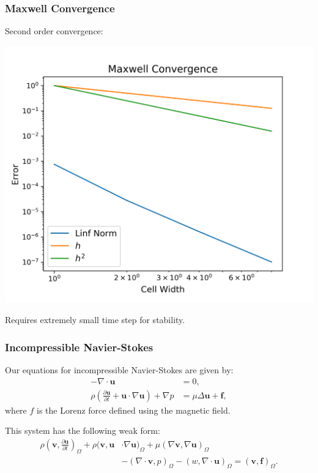 \documentclass[mathserif]{beamer} %
\begin{document}
\begin{frame}
    \frametitle{Maxwell Convergence}
    Second order convergence:
    \begin{center}
        \includegraphics[scale=.5]{mx_conv.png}
    \end{center}
    Requires extremely small time step for stability.
\end{frame}

\begin{frame}
    \frametitle{Incompressible Navier-Stokes}
    Our equations for incompressible Navier-Stokes are given by:
    \begin{align*}
        -\nabla \cdot \boldsymbol{u} &= 0,\nonumber\\
        \rho \left(\frac{\partial \boldsymbol{u}}{\partial t} + \boldsymbol{u} \cdot \nabla \boldsymbol{u}\right) + \nabla p &= \mu \Delta \boldsymbol{u} + \boldsymbol{f},
    \end{align*}
    where $f$ is the Lorenz force defined using the magnetic field.

   \pause 

    \vspace{.6cm}
    This system has the following weak form:
   \pause 
    \begin{align*}
        \rho\left(\boldsymbol{v},\frac{\partial \boldsymbol{u}}{\partial t} \right)_\Omega 
        + \rho (\boldsymbol{v},\boldsymbol{u} &\cdot \nabla \boldsymbol{u})_\Omega 
        + \mu (\nabla \boldsymbol{v}, \nabla \boldsymbol{u}) _\Omega \\
        &- (\nabla \cdot \boldsymbol{v}, p) _\Omega
        - (w, \nabla \cdot \boldsymbol{u})_\Omega = (\boldsymbol{v},\boldsymbol{f})_\Omega.
    \end{align*}
\end{frame}
\end{document}
